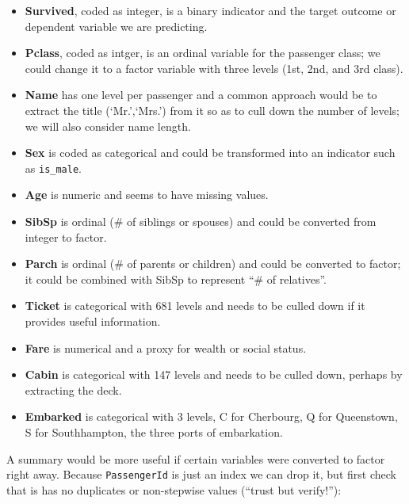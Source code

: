 \documentclass[]{article}
\newenvironment{Shaded}{\begin{snugshade}}{\end{snugshade}}
\newcommand{\KeywordTok}[1]{\textcolor[rgb]{0.13,0.29,0.53}{\textbf{#1}}}
\newcommand{\DecValTok}[1]{\textcolor[rgb]{0.00,0.00,0.81}{#1}}
\newcommand{\StringTok}[1]{\textcolor[rgb]{0.31,0.60,0.02}{#1}}
\newcommand{\CommentTok}[1]{\textcolor[rgb]{0.56,0.35,0.01}{\textit{#1}}}
\newcommand{\OperatorTok}[1]{\textcolor[rgb]{0.81,0.36,0.00}{\textbf{#1}}}
\newcommand{\NormalTok}[1]{#1}
\providecommand{\tightlist}{%
  \setlength{\itemsep}{0pt}\setlength{\parskip}{0pt}}
\begin{document}
\begin{itemize}
\tightlist
\item
  \textbf{Survived}, coded as integer, is a binary indicator and the
  target outcome or dependent variable we are predicting.
\item
  \textbf{Pclass}, coded as intger, is an ordinal variable for the
  passenger class; we could change it to a factor variable with three
  levels (1st, 2nd, and 3rd class).
\item
  \textbf{Name} has one level per passenger and a common approach would
  be to extract the title (`Mr.',`Mrs.') from it so as to cull down the
  number of levels; we will also consider name length.
\item
  \textbf{Sex} is coded as categorical and could be transformed into an
  indicator such as \texttt{is\_male}.
\item
  \textbf{Age} is numeric and seems to have missing values.
\item
  \textbf{SibSp} is ordinal (\# of siblings or spouses) and could be
  converted from integer to factor.
\item
  \textbf{Parch} is ordinal (\# of parents or children) and could be
  converted to factor; it could be combined with SibSp to represent ``\#
  of relatives''.
\item
  \textbf{Ticket} is categorical with 681 levels and needs to be culled
  down if it provides useful information.
\item
  \textbf{Fare} is numerical and a proxy for wealth or social status.
\item
  \textbf{Cabin} is categorical with 147 levels and needs to be culled
  down, perhaps by extracting the deck.
\item
  \textbf{Embarked} is categorical with 3 levels, C for Cherbourg, Q for
  Queenstown, S for Southhampton, the three ports of embarkation.
\end{itemize}

A summary would be more useful if certain variables were converted to
factor right away. Because \texttt{PassengerId} is just an index we can
drop it, but first check that is has no duplicates or non-stepwise
values (``trust but verify!''):

\begin{Shaded}
\end{Shaded}
\end{document}

